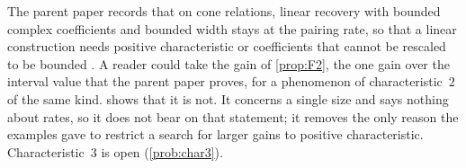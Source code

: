 The parent paper records that on cone relations, linear recovery with bounded complex coefficients and bounded width
stays at the pairing rate, so that a linear construction needs positive characteristic or coefficients that cannot be
rescaled to be bounded \cite[Section~4.5]{SeventeenthPaper2026}. A reader could take the gain of \cref{prop:F2}, the one
gain over the interval value that the parent paper proves, for a phenomenon of characteristic~$2$ of the same kind.
 shows that it is not. It concerns a single size and says nothing about rates, so it does not bear on
that statement; it removes the only reason the examples gave to restrict a search for larger gains to positive
characteristic. Characteristic~$3$ is open (\cref{prob:char3}).
